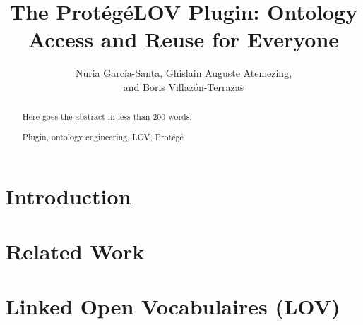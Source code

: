 \documentclass[runningheads,a4paper]{llncs}
\newcommand{\keywords}[1]{\par\addvspace\baselineskip
\noindent\keywordname\enspace\ignorespaces#1}
\begin{document}

\title{The Prot{\'e}g{\'e}LOV Plugin: Ontology Access and Reuse for Everyone }


\author{ Nuria Garc\'ia-Santa, Ghislain Auguste Atemezing,\\ and Boris Villaz{\'o}n-Terrazas}


\maketitle


\begin{abstract}
Here goes the abstract in less than 200 words.

\keywords{Plugin, ontology engineering, LOV, Prot{\'e}g{\'e}} 
\end{abstract}


\section{Introduction}\label{sec:introduction}




\section{Related Work}\label{sec:soa}




\section{Linked Open Vocabulaires (LOV)}\label{sec:lov}




\end{document}
